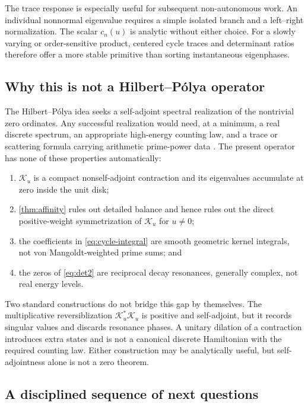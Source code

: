 \documentclass[11pt]{article}
\theoremstyle{definition}
\theoremstyle{remark}
\newcommand{\cK}{\mathcal K}
\begin{document}
The trace response is especially useful for subsequent non-autonomous work.
An individual nonnormal eigenvalue requires a simple isolated branch and a
left--right normalization.  The scalar $c_n(u)$ is analytic without either
choice.  For a slowly varying or order-sensitive product, centered cycle
traces and determinant ratios therefore offer a more stable primitive than
sorting instantaneous eigenphases.

\subsection{Why this is not a Hilbert--P\'olya operator}

The Hilbert--P\'olya idea seeks a self-adjoint spectral realization of the
nontrivial zero ordinates.  Any successful realization would need, at a
minimum, a real discrete spectrum, an appropriate high-energy counting law,
and a trace or scattering formula carrying arithmetic prime-power data
\citep{Edwards1974,BerryKeating1999,Connes1999}.  The present operator has none
of these properties automatically:
\begin{enumerate}[label=(\roman*),leftmargin=2.2em]
 \item $\cK_u$ is a compact nonself-adjoint contraction and its eigenvalues
 accumulate at zero inside the unit disk;
 \item \cref{thm:affinity} rules out detailed balance and hence rules out the
 direct positive-weight symmetrization of $\cK_u$ for $u\ne0$;
 \item the coefficients in \eqref{eq:cycle-integral} are smooth geometric
 kernel integrals, not von Mangoldt-weighted prime sums; and
 \item the zeros of \eqref{eq:det2} are reciprocal decay resonances, generally
 complex, not real energy levels.
\end{enumerate}

Two standard constructions do not bridge this gap by themselves.  The
multiplicative reversiblization $\cK_u^*\cK_u$ is positive and self-adjoint,
but it records singular values and discards resonance phases.  A unitary
dilation of a contraction introduces extra states and is not a canonical
discrete Hamiltonian with the required counting law.  Either construction may
be analytically useful, but self-adjointness alone is not a zero theorem.

\subsection{A disciplined sequence of next questions}
\end{document}
